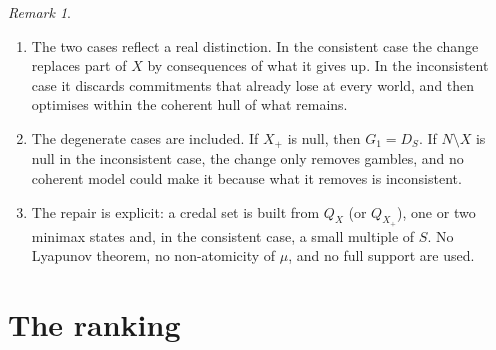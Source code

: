 \documentclass[11pt]{article}
\theoremstyle{plain}
\theoremstyle{definition}
\theoremstyle{remark}
\newtheorem{remark}[theorem]{Remark}
\begin{document}
\begin{remark}\label{rem:repair}
\begin{enumerate}[label=(\alph*)]
  \item The two cases reflect a real distinction. In the consistent case the change replaces
  part of $X$ by consequences of what it gives up. In the inconsistent case it discards
  commitments that already lose at every world, and then optimises within the coherent hull
  of what remains.
  \item The degenerate cases are included. If $X_+$ is null, then $G_1=D_S$. If $N\setminus X$
  is null in the inconsistent case, the change only removes gambles, and no coherent model
  could make it because what it removes is inconsistent.
  \item The repair is explicit: a credal set is built from $Q_X$ (or $Q_{X_+}$), one or two
  minimax states and, in the consistent case, a small multiple of $S$. No Lyapunov theorem,
  no non-atomicity of $\mu$, and no full support are used.
\end{enumerate}
\end{remark}

\section{The ranking}\label{sec:ranking}
\end{document}
